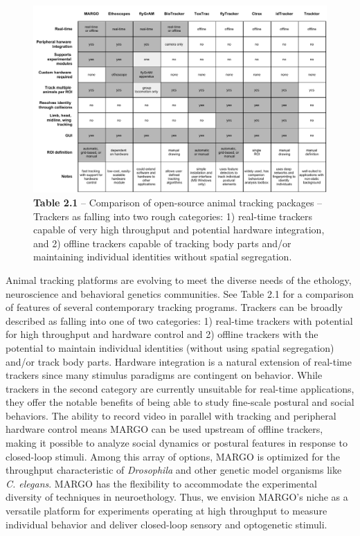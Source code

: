 \documentclass[12pt,letterpaper]{article}
\begin{document}
\begin{figure}[t!]
 \includegraphics[width=\textwidth]{../figures/chapter_2/tab_2-1.pdf}
\caption*{\textbf{Table 2.1} -- Comparison of open-source animal tracking packages -- Trackers as falling into two rough categories: 1) real-time trackers capable of very high throughput and potential hardware integration, and 2) offline trackers capable of tracking body parts and/or maintaining individual identities without spatial segregation.}
\end{figure}

Animal tracking platforms are evolving to meet the diverse needs of the ethology, neuroscience and behavioral genetics communities. See Table 2.1 for a comparison of features of several contemporary tracking programs. Trackers can be broadly described as falling into one of two categories: 1) real-time trackers \cite{Fry_TrackFly_2008,Straw_Multi_2010,Chagas_The_2017,Geissmann_Ethoscopes_2017,Mnck_BioTracker_2018,Scaplen_Automated_2019} with potential for high throughput and hardware control and 2) offline trackers \cite{Branson_High_2009,Prez-Escudero_idTracker_2014,Eyjolfsdottir_Detecting_2014,Rodriguez_ToxId_2017,Sridhar_2019,romero-ferrero_2019} with the potential to maintain individual identities (without using spatial segregation) and/or track body parts. Hardware integration is a natural extension of real-time trackers since many stimulus paradigms are contingent on behavior. While trackers in the second category are currently unsuitable for real-time applications, they offer the notable benefits of being able to study fine-scale postural and social behaviors. The ability to record video in parallel with tracking and peripheral hardware control means MARGO can be used upstream of offline trackers, making it possible to analyze social dynamics or postural features in response to closed-loop stimuli. Among this array of options, MARGO is optimized for the throughput characteristic of \textit{Drosophila} and other genetic model organisms like \textit{C. elegans}. MARGO has the flexibility to accommodate the experimental diversity of techniques in neuroethology. Thus, we envision MARGO's niche as a versatile platform for experiments operating at high throughput to measure individual behavior and deliver closed-loop sensory and optogenetic stimuli.
\end{document}
